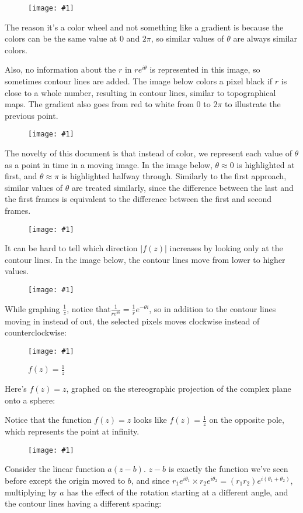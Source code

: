 \documentclass[xhtml, mathjax]{article}
\newcommand{\singleimage}[2] {
  \begin{figure}
    \centering
    \texttt{[image: \#1]}\par
    #2
  \end{figure}
}
\begin{document}
    \singleimage{z_color.gif}{}

    The reason it's a color wheel and not something like a gradient is because
    the colors can be the same value at $0$ and $2\pi$, so similar values of
    $\theta$ are always similar colors.

    Also, no information about the $r$ in $re^{i\theta}$ is represented in this
    image, so sometimes contour lines are added. The image below colors a pixel
    black if $r$ is close to a whole number, resulting in contour lines,
    similar to topographical maps. The gradient also goes from red to white from
    $0$ to $2\pi$ to illustrate the previous point.

    \singleimage{z_contour_gradient.gif}{}

    The novelty of this document is that instead of color, we represent each
    value of $\theta$ as a point in time in a moving image. In the image below,
    $\theta \approx 0$ is highlighted at first, and $\theta \approx \pi$ is
    highlighted halfway through. Similarly to the first approach, similar values
    of $\theta$ are treated similarly, since the difference between the last and
    the first frames is equivalent to the difference between the first and
    second frames.

    \singleimage{z_loop.gif}{}

    It can be hard to tell which direction $|f(z)|$ increases by looking only at
    the contour lines. In the image below, the contour lines move from lower to
    higher values.

    \singleimage{z_contour_loop.gif}{}

    While graphing $\frac{1}{z}$, notice that$\frac{1}{re^{\theta i}} =
    \frac{1}{r}e^{-\theta i}$, so in addition to the contour lines moving in
    instead of out, the selected pixels moves clockwise instead of
    counterclockwise:

    \singleimage{inv.gif}{$f(z) = \frac{1}{z}$}

    Here's $f(z) = z$, graphed on the stereographic projection of the complex
    plane onto a sphere:

    Notice that the function $f(z) = z$ looks like $f(z) = \frac{1}{z}$ on the
    opposite pole, which represents the point at infinity.

    \singleimage{z_sphere.gif}{}

    Consider the linear function $a(z-b)$. $z-b$ is exactly the
    function we've seen before except the origin moved to $b$, and since
    $r_1e^{i\theta_1} \times r_2e^{i\theta_2} = (r_1 r_2) e^{i(\theta_1 +
    \theta_2)}$, multiplying by $a$ has the effect of the rotation starting at a
    different angle, and the contour lines having a different spacing:
\end{document}
